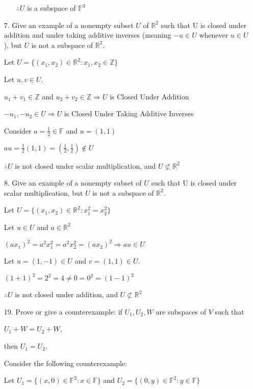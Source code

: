 \documentclass{article}
\begin{document}
\begin{enumerate}[nolistsep]
\begin{enumerate}[nolistsep]
			$\therefore U$ is a subspace of $\mathbb{F}^3$
			
		\end{enumerate}
		
		\item[7.] Give an example of a nonempty subset $U$ of $\mathbb{R}^2$ such that U is closed under addition and under taking additive inverses (meaning $-u \in U$ whenever $u \in U$), but $U$ is not a subspace of $\mathbb{R}^2$.
		
		Let $U = \{(x_1, x_2) \in \mathbb{R}^2 : x_1, x_2 \in \mathbb{Z}\}$
		
		Let $u, v \in U$.
		
		$u_1 + v_1 \in \mathbb{Z}$ and $u_2 + v_2 \in \mathbb{Z} \Rightarrow U$ is Closed Under Addition
		
		$-u_1, -u_2 \in U \Rightarrow U$ is Closed Under Taking Additive Inverses
		
		Consider $a = \frac{1}{2} \in \mathbb{F}$ and $u = (1, 1)$
		
		$au = \frac{1}{2}(1, 1) = (\frac{1}{2}, \frac{1}{2}) \not\in U$
		
		$\therefore U$ is not closed under scalar multiplication, and $U \not\subset \mathbb{R}^2$
		
		\item[8.] Give an example of a nonempty subset of $U$ such that U is closed under scalar multiplication, but $U$ is not a subspace of $\mathbb{R}^2$.
		
		Let $U = \{(x_1, x_2) \in \mathbb{R}^2 : x_1^2 = x_2^2\}$
		
		Let $u \in U$ and $a \in \mathbb{R}^2$
		
		$(ax_1)^2 = a^2x_1^2 = a^2x_2^2 = (ax_2)^2 \Rightarrow au \in U$
		
		Let $u = (1, -1) \in U$ and $v = (1, 1) \in U$.
		
		$(1 + 1)^2 = 2^2 = 4 \neq 0 = 0^2 = (1 - 1)^2$
		
		$\therefore U$ is not closed under addition, and $U \not\subset \mathbb{R}^2$
		
		\item[19.] Prove or give a counterexample: if $U_1, U_2, W$ are subspaces of $V$ such that
		
\centerline{$U_1 + W = U_2 + W$,}

then $U_1 = U_2$. 
		
		Consider the following counterexample:

		Let $U_1 = \{(x, 0) \in \mathbb{F}^2 : x \in \mathbb{F}\}$ and $U_2 = \{(0, y) \in \mathbb{F}^2 : y \in \mathbb{F}\}$
		

\end{enumerate}
\end{document}
